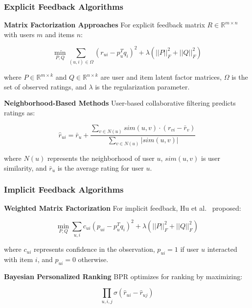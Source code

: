 \subsubsection{Explicit Feedback Algorithms}

\textbf{Matrix Factorization Approaches}
For explicit feedback matrix $R \in \mathbb{R}^{m \times n}$ with users $m$ and items $n$:

\begin{equation}
\min_{P,Q} \sum_{(u,i) \in \Omega} (r_{ui} - p_u^T q_i)^2 + \lambda(||P||_F^2 + ||Q||_F^2)
\end{equation}

where $P \in \mathbb{R}^{m \times k}$ and $Q \in \mathbb{R}^{n \times k}$ are user and item latent factor matrices, $\Omega$ is the set of observed ratings, and $\lambda$ is the regularization parameter.

\textbf{Neighborhood-Based Methods}
User-based collaborative filtering predicts ratings as:

\begin{equation}
\hat{r}_{ui} = \bar{r}_u + \frac{\sum_{v \in N(u)} sim(u,v) \cdot (r_{vi} - \bar{r}_v)}{\sum_{v \in N(u)} |sim(u,v)|}
\end{equation}

where $N(u)$ represents the neighborhood of user $u$, $sim(u,v)$ is user similarity, and $\bar{r}_u$ is the average rating for user $u$.

\subsubsection{Implicit Feedback Algorithms}

\textbf{Weighted Matrix Factorization}
For implicit feedback, Hu et al.~\cite{hu2008collaborative} proposed:

\begin{equation}
\min_{P,Q} \sum_{u,i} c_{ui}(p_{ui} - p_u^T q_i)^2 + \lambda(||P||_F^2 + ||Q||_F^2)
\end{equation}

where $c_{ui}$ represents confidence in the observation, $p_{ui} = 1$ if user $u$ interacted with item $i$, and $p_{ui} = 0$ otherwise.

\textbf{Bayesian Personalized Ranking}
BPR optimizes for ranking by maximizing:

\begin{equation}
\prod_{u,i,j} \sigma(\hat{r}_{ui} - \hat{r}_{uj})
\end{equation}


